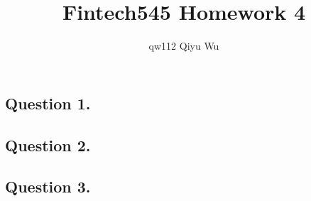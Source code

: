 \documentclass[a4paper,12pt]{article}
\title{Fintech545 Homework 4}
\author{qw112 Qiyu Wu}
\date{}
\begin{document}
\maketitle
\subsection*{Question 1. }


\subsection*{Question 2. }


\subsection*{Question 3. }
\end{document}
